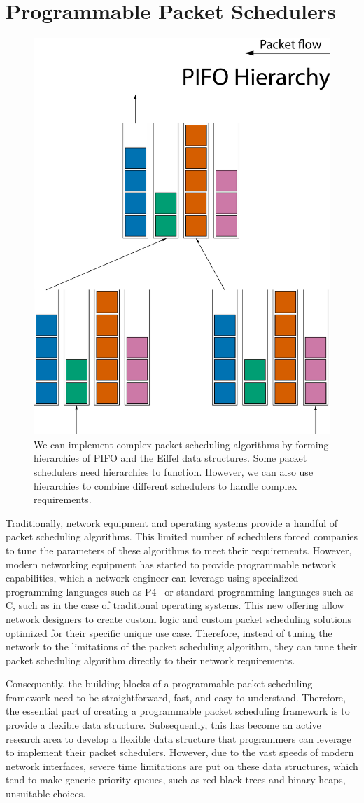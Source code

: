 \documentclass[sigconf, nonacm]{acmart}
\begin{document}
\section{Programmable Packet Schedulers}

\begin{figure}
  \includegraphics[width=0.5\linewidth]{pifo-hierarchy.pdf}
  \caption{We can implement complex packet scheduling algorithms by forming hierarchies of PIFO and the Eiffel data structures. Some packet schedulers need hierarchies to function. However, we can also use hierarchies to combine different schedulers to handle complex requirements.}
  \label{fig:pifo_hierarchy}
\end{figure}

Traditionally, network equipment and operating systems provide a handful of packet scheduling algorithms. This limited number of schedulers forced companies to tune the parameters of these algorithms to meet their requirements. However, modern networking equipment has started to provide programmable network capabilities, which a network engineer can leverage using specialized programming languages such as P4~\cite{p4} or standard programming languages such as C, such as in the case of traditional operating systems. This new offering allow network designers to create custom logic and custom packet scheduling solutions optimized for their specific unique use case. Therefore, instead of tuning the network to the limitations of the packet scheduling algorithm, they can tune their packet scheduling algorithm directly to their network requirements.

Consequently, the building blocks of a programmable packet scheduling framework need to be straightforward, fast, and easy to understand. Therefore, the essential part of creating a programmable packet scheduling framework is to provide a flexible data structure. Subsequently, this has become an active research area to develop a flexible data structure that programmers can leverage to implement their packet schedulers. However, due to the vast speeds of modern network interfaces, severe time limitations are put on these data structures, which tend to make generic priority queues, such as red-black trees and binary heaps, unsuitable choices.
\end{document}
